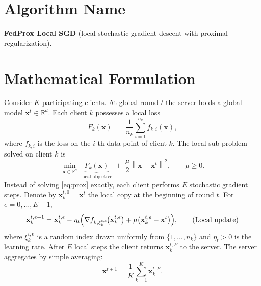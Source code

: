 \documentclass{article}
\newcommand{\norm}[1]{\left\lVert #1 \right\rVert}
\begin{document}
\section*{Algorithm Name}
\textbf{FedProx Local SGD} (local stochastic gradient descent with proximal regularization).

\section*{Mathematical Formulation}
Consider $K$ participating clients.  At global round $t$ the server holds a global model $\mathbf{x}^t\in\mathbb{R}^d$.  
Each client $k$ possesses a local loss
\[
F_k(\mathbf{x})\;=\;\frac{1}{n_k}\sum_{i=1}^{n_k} f_{k,i}(\mathbf{x}),
\]
where $f_{k,i}$ is the loss on the $i$‑th data point of client $k$.
The local sub‑problem solved on client $k$ is
\begin{equation}
\label{eq:prox}
\min_{\mathbf{x}\in\mathbb{R}^d}\; 
\underbrace{F_k(\mathbf{x})}_{\text{local objective}}
\;+\;
\frac{\mu}{2}\norm{\mathbf{x}-\mathbf{x}^t}^2,
\qquad \mu\ge 0.
\end{equation}
Instead of solving \eqref{eq:prox} exactly, each client performs $E$ stochastic gradient steps.
Denote by $\mathbf{x}_{k}^{t,0}=\mathbf{x}^t$ the local copy at the beginning of round $t$.
For $e=0,\dots,E-1$,
\[
\mathbf{x}_{k}^{t,e+1}
=
\mathbf{x}_{k}^{t,e}
-\eta_t\Bigl(
\nabla f_{k,\xi_{k}^{t,e}}\!\bigl(\mathbf{x}_{k}^{t,e}\bigr)
+\mu\bigl(\mathbf{x}_{k}^{t,e}-\mathbf{x}^t\bigr)
\Bigr),
\tag{Local update}
\]
where $\xi_{k}^{t,e}$ is a random index drawn uniformly from $\{1,\dots,n_k\}$ and $\eta_t>0$ is the learning rate.
After $E$ local steps the client returns $\mathbf{x}_{k}^{t,E}$ to the server.
The server aggregates by simple averaging:
\[
\mathbf{x}^{t+1}
=
\frac{1}{K}\sum_{k=1}^{K}\mathbf{x}_{k}^{t,E}.
\tag{Global aggregation}
\]
\end{document}
